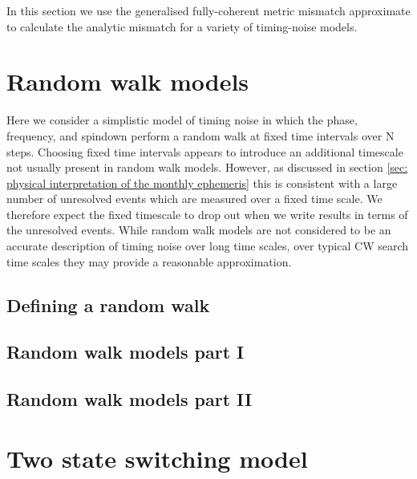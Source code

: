 \documentclass[../full_thesis/full_thesis.tex]{subfiles}
\newcommand{\thisdir}{../analytic_timing_noise_cgw}
\begin{document}
In this section we use the generalised fully-coherent metric mismatch approximate
to calculate the analytic mismatch for a variety of timing-noise models.

\section{Random walk models}
\label{sec: random walk models}

Here  we consider a simplistic model of timing noise in which the phase,
frequency, and spindown perform a random walk at fixed time intervals over N
steps. Choosing fixed time intervals appears to introduce an additional
timescale not usually present in random walk models. However, as discussed in
section \ref{sec: physical interpretation of the monthly ephemeris} this is
consistent with a large number of unresolved events which are measured over a
fixed time scale. We therefore expect the fixed timescale to drop out when we
write results in terms of the unresolved events.  While random walk models are
not considered to be an accurate description of timing noise over long time
scales, over typical CW search time scales they may provide a reasonable
approximation.

\subsection{Defining a random walk}
\label{sec: Defining a random walk}


\subsection{Random walk models part I}
\label{sec: Random walk models part I}


\subsection{Random walk models part II} 
\label{sec: Random walk models part II}


\section{Two state switching model}
\label{sec: Two state switching model}



\begin{subappendices}
    
\end{subappendices}


\biblio
\end{document}
